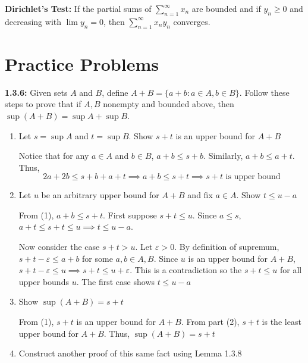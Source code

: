 \documentclass[12pt]{article}
\newcommand{\ep}{\varepsilon}
\begin{document}
\textbf{Dirichlet's Test:} If the partial sums of $\sum_{n=1}^{\infty} x_n$ are bounded and if $y_n \geq 0$ and decreasing with $\lim y_n = 0$, then $\sum_{n=1}^{\infty} x_ny_n$ converges.



\section*{Practice Problems}
\textbf{1.3.6:} Given sets $A$ and $B$, define $A + B = \{a + b: a \in A, b \in B\}$. Follow these steps to prove that if $A, B$ nonempty and bounded above, then $\sup(A + B) = \sup A + \sup B$.
\begin{enumerate}
    \item Let $s = \sup A$ and $t= \sup B$. Show $s + t$ is an upper bound for $A + B$
    
        \color{blue}
            Notice that for any $a \in A$ and $b \in B$, $a + b \leq s + b$. Similarly, $a + b \leq a + t$. Thus, 
            \[2a + 2b \leq s + b + a + t \implies a + b \leq s + t \implies s + t \text{ is upper bound}\]
        \color{black}

    \item Let $u$ be an arbitrary upper bound for $A + B$ and fix $a \in A$. Show $t \leq u - a$

        \color{red}
            From (1), $a + b \leq s + t$. First suppose $s + t \leq u$. Since $a \leq s$, $a + t \leq s + t \leq u \implies t \leq u - a$. 
            
            Now consider the case $s + t > u$. Let $\ep > 0$. By definition of supremum, $s + t - \ep \leq a + b$ for some $a, b \in A, B$. Since $u$ is an upper bound for $A + B$, $s + t - \ep \leq u \implies s + t \leq u + \ep$. This is a contradiction so the $s + t \leq u$ for all upper bounds $u$. The first case shows $t \leq u - a$
        \color{black}

    \item Show $\sup(A + B) = s + t$
    
        \color{blue}
            From (1), $s + t$ is an upper bound for $A + B$. From part (2), $s + t$ is the least upper bound for $A + B$. Thus, $\sup(A + B) = s + t$
        \color{black}

    \color{red}
    \item Construct another proof of this same fact using Lemma 1.3.8
    
    \color{black}
 \end{enumerate}
\end{document}
